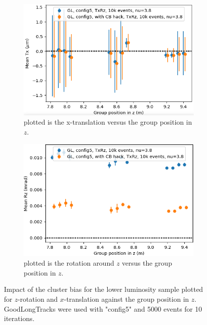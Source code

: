 \begin{figure}
  \centering
  \begin{subfigure}[b]{0.48\textwidth}
    \centering
    \includegraphics[width=\textwidth]{plots/renewed_plots/e5/4_19_3.png}
    \caption{plotted is the x-translation versus the group position in $z$.}
    \label{fig:cbTxlow}
  \end{subfigure}
  \hfill
  \begin{subfigure}[b]{0.48\textwidth}
    \centering
    \includegraphics[width=\textwidth]{plots/renewed_plots/e5/4_19_4.png}
    \caption{plotted is the rotation around $z$ versus the group position in $z$.}
    \label{fig:cbRzlow}
  \end{subfigure}
  \caption{Impact of the cluster bias for the lower luminosity sample plotted for $z$-rotation and $x$-translation against the group position in $z$. GoodLongTracks were used with "config5" and 5000 events for 10 iterations.}
  \label{fig:cblow}
\end{figure}

